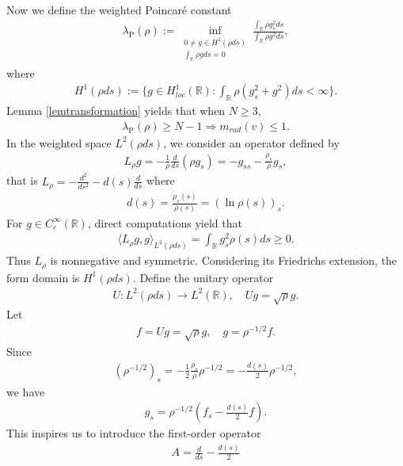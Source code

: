 \documentclass{article}
\theoremstyle{definition} \theoremstyle{remark}
\numberwithin{equation}{section}
\newcommand{\R}{\mathbb{R}}
\newcommand{\la}{\lambda}
\begin{document}
\vskip0.3in


	Now we define the weighted Poincar\'e constant
	\begin{align} \label{def:laPrho}
		\la_{\text{P}}(\rho) := \inf_{\substack{0 \neq g \in H^1(\rho ds) \\ \int_{\R}\rho gds = 0}} \frac{\int_{\R}\rho g_s^2ds}{\int_{\R}\rho g^2ds},
	\end{align}
	where
	\begin{align*}
		H^1(\rho ds) := \big\{g \in H^1_{loc}(\R): \int_\R \rho \left(g_s^2 + g^2\right)ds < \infty \big\}.
	\end{align*}
	Lemma \ref{lemtransformation} yields that when $N \ge 3$,
	\begin{align*}
		\la_{\text{P}}(\rho) \ge N-1 \Rightarrow m_{rad}(v) \le 1 .
	\end{align*}
	In the weighted space $L^2(\rho ds)$, we consider an operator defined by
	\begin{align} \label{def:Lrho}
		L_\rho g = -\frac{1}{\rho}\frac{d}{ds}(\rho g_s) = -g_{ss} - \frac{\rho_s}{\rho}g_s,
	\end{align}
	that is $L_\rho = - \frac{d^2}{ds^2} - d(s)\frac{d}{ds}$ where
	\begin{align*}
		d(s) = \frac{\rho_s(s)}{\rho(s)} = (\ln \rho(s))_s.
	\end{align*}
	For $g \in C_c^\infty(\R)$, direct computations yield that
	\begin{align*}
		\langle L_\rho g,g \rangle_{L^2(\rho ds)} = \int_{\R}g_s^2\rho(s)ds \ge 0.
	\end{align*}
	Thus $L_\rho$ is nonnegative and symmetric. Considering its Friedrichs extension, the form domain is $H^1(\rho ds)$. Define the unitary operator
	\begin{align*}
		U: L^2(\rho ds) \to L^2(\R), \quad Ug = \sqrt{\rho}g.
	\end{align*}
	Let
	\begin{align*}
		f = Ug = \sqrt{\rho}g, \quad g = \rho^{-1/2}f.
	\end{align*}
	Since
	\begin{align*}
		(\rho^{-1/2})_s = -\frac 12\frac{\rho_s}{\rho}\rho^{-1/2} = -\frac{d(s)}{2}\rho^{-1/2},
	\end{align*}
	we have
	\begin{align*}
		g_s = \rho^{-1/2} \left(f_s - \frac{d(s)}{2}f\right).
	\end{align*}
	This inspires us to introduce the first-order operator
	\begin{align*}
		A = \frac{d}{ds} - \frac{d(s)}{2}
	\end{align*}
\end{document}
